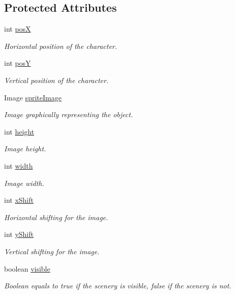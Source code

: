 \subsection*{Protected Attributes}
\begin{DoxyCompactItemize}
\item 
int \hyperlink{a00005_a78ad3a5c111a39df2ba12b542fa175b4}{pos\-X}
\begin{DoxyCompactList}\small\item\em Horizontal position of the character. \end{DoxyCompactList}\item 
int \hyperlink{a00005_a1e81a73a02b73e6f1608ba3c1b6d83ef}{pos\-Y}
\begin{DoxyCompactList}\small\item\em Vertical position of the character. \end{DoxyCompactList}\item 
Image \hyperlink{a00024_a512d9c0a154e6843389e343d80843326}{sprite\-Image}
\begin{DoxyCompactList}\small\item\em Image graphically representing the object. \end{DoxyCompactList}\item 
int \hyperlink{a00024_a54b4edfa060087e78a829105bf62a900}{height}
\begin{DoxyCompactList}\small\item\em Image height. \end{DoxyCompactList}\item 
int \hyperlink{a00024_ad10b27080954e2fc06aa1718f47c4ce1}{width}
\begin{DoxyCompactList}\small\item\em Image width. \end{DoxyCompactList}\item 
int \hyperlink{a00024_a0999f105f7630fd67fd9d440da6983aa}{x\-Shift}
\begin{DoxyCompactList}\small\item\em Horizontal shifting for the image. \end{DoxyCompactList}\item 
int \hyperlink{a00024_ac9ca2c17cf6920deffe490c013b0e638}{y\-Shift}
\begin{DoxyCompactList}\small\item\em Vertical shifting for the image. \end{DoxyCompactList}\item 
boolean \hyperlink{a00024_a7b22a78d3126c947b7010fdbbea02218}{visible}
\begin{DoxyCompactList}\small\item\em Boolean equals to true if the scenery is visible, false if the scenery is not. \end{DoxyCompactList}\end{DoxyCompactItemize}

